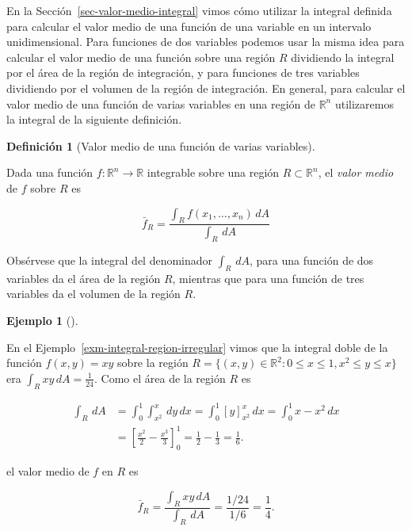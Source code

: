 \documentclass[
  a4paper,
]{scrreport}
\theoremstyle{plain}
\theoremstyle{definition}
\theoremstyle{plain}
\theoremstyle{plain}
\theoremstyle{definition}
\newtheorem{example}{Ejemplo}[chapter]
\theoremstyle{definition}
\newtheorem{definition}{Definición}[chapter]
\theoremstyle{remark}
\begin{document}
En la Sección~\ref{sec-valor-medio-integral} vimos cómo utilizar la
integral definida para calcular el valor medio de una función de una
variable en un intervalo unidimensional. Para funciones de dos variables
podemos usar la misma idea para calcular el valor medio de una función
sobre una región \(R\) dividiendo la integral por el área de la región
de integración, y para funciones de tres variables dividiendo por el
volumen de la región de integración. En general, para calcular el valor
medio de una función de varias variables en una región de
\(\mathbb{R}^n\) utilizaremos la integral de la siguiente definición.

\begin{definition}[Valor medio de una función de varias
variables]\protect\hypertarget{def-valor-medio-funcion-varias-variables}{}\label{def-valor-medio-funcion-varias-variables}

Dada una función \(f:\mathbb{R}^n\to \mathbb{R}\) integrable sobre una
región \(R\subset \mathbb{R}^n\), el \emph{valor medio} de \(f\) sobre
\(R\) es

\[
\bar{f}_R = \frac{\int_R f(x_1,\ldots,x_n)\,dA}{\int_R\,dA}
\]

\end{definition}

\begin{tcolorbox}[enhanced jigsaw, titlerule=0mm, arc=.35mm, colframe=quarto-callout-note-color-frame, bottomrule=.15mm, opacitybacktitle=0.6, rightrule=.15mm, coltitle=black, colback=white, toprule=.15mm, title=\textcolor{quarto-callout-note-color}{\faInfo}\hspace{0.5em}{Nota}, leftrule=.75mm, bottomtitle=1mm, opacityback=0, breakable, colbacktitle=quarto-callout-note-color!10!white, toptitle=1mm, left=2mm]

Obsérvese que la integral del denominador \(\int_R\,dA\), para una
función de dos variables da el área de la región \(R\), mientras que
para una función de tres variables da el volumen de la región \(R\).

\end{tcolorbox}

\begin{example}[]\protect\hypertarget{exm-valor-medio-funcion-varias-variables}{}\label{exm-valor-medio-funcion-varias-variables}

En el Ejemplo~\ref{exm-integral-region-irregular} vimos que la integral
doble de la función \(f(x,y)=xy\) sobre la región
\(R=\{(x,y)\in \mathbb{R}^2: 0\leq x\leq 1, x^2\leq y\leq x\}\) era
\(\int_R xy\,dA = \frac{1}{24}\). Como el área de la región \(R\) es

\begin{align*}
\int_R \,dA
&= \int_0^1 \int_{x^2}^x  \,dy\,dx
= \int_0^1 [y]_{x^2}^x\,dx
= \int_0^1 x-x^2\,dx \\
&= \left[\frac{x^2}{2}-\frac{x^3}{3}\right]_0^1
= \frac{1}{2}-\frac{1}{3}
= \frac{1}{6}.
\end{align*}

el valor medio de \(f\) en \(R\) es

\[
 \bar f_R 
 = \frac{\int_R xy\,dA}{\int_R\,dA}
 = \frac{1/24}{1/6} 
 = \frac{1}{4}.
 \]

\end{example}
\end{document}
